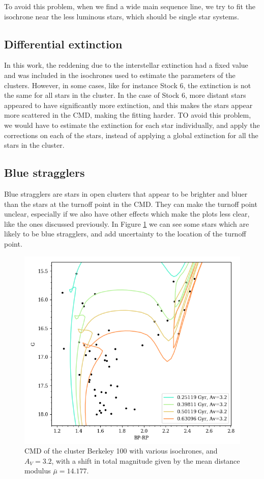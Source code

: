 \documentclass[twocolumn]{revtex4}
\begin{document}
To avoid this problem, when we find a wide main sequence line, we try to fit the isochrone near the less luminous stars, which should be single star systems.

\subsection{Differential extinction}
In this work, the reddening due to the interstellar extinction had a fixed value and was included in the isochrones used to estimate the parameters of the clusters. However, in some cases, like for instance Stock 6, the extinction is not the same for all stars in the cluster. In the case of Stock 6, more distant stars appeared to have significantly more extinction, and this makes the stars appear more scattered in the CMD, making the fitting harder. TO avoid this problem, we would have to estimate the extinction for each star individually, and apply the corrections on each of the stars, instead of applying a global extinction for all the stars in the cluster.

\subsection{Blue stragglers}
Blue stragglers are stars in open clusters that appear to be brighter and bluer than the stars at the turnoff point in the CMD. They can make the turnoff point unclear, especially if we also have other effects which make the plots less clear, like the ones discussed previously. In Figure \ref{blue-stragglers} we can see some stars which are likely to be blue stragglers, and add uncertainty to the location of the turnoff point.

\begin{figure}[h!]
\centering
\includegraphics[scale=0.55]{berkeley-example}
\caption{CMD of the cluster Berkeley 100 with various isochrones, and $A_V = 3.2$, with a shift in total magnitude given by the mean distance modulus $\bar{\mu} = 14.177$.}
\label{blue-stragglers}
\end{figure}
\end{document}

